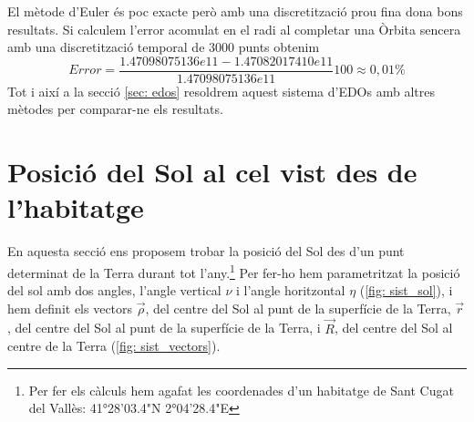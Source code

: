 \documentclass[11pt]{article}
\begin{document}
El mètode d'Euler és poc exacte però amb una discretització prou fina dona bons resultats. Si calculem l'error acomulat en el radi al completar una Òrbita sencera amb una discretització temporal de $3000$ punts obtenim
\begin{equation}
    Error = \frac{1.47098075136e11-1.47082017410e11}{1.47098075136e11}100\approx0,01\%
\end{equation}
Tot i així a la secció \ref{sec: edos} resoldrem aquest sistema d'EDOs amb altres mètodes per comparar-ne els resultats.


\section{Posició del Sol al cel vist des de l'habitatge} \label{sec: seccio_2}
En aquesta secció ens proposem trobar la posició del Sol des d'un punt determinat de la Terra durant tot l'any.\footnote{\label{nota: habitatge}Per fer els càlculs hem agafat les coordenades d'un habitatge de Sant Cugat del Vallès: 41°28'03.4"N 2°04'28.4"E} Per fer-ho hem parametritzat la posició del sol amb dos angles, l'angle vertical $\nu$ i l'angle horitzontal $\eta$ (\ref{fig: sist_sol}), i hem definit els vectors $\vec{\rho}$, del centre del Sol al punt de la superfície de la Terra, $\vec{r}$, del centre del Sol al punt de la superfície de la Terra, i $\vec{R}$, del centre del Sol al centre de la Terra (\ref{fig: sist_vectors}).
\end{document}
